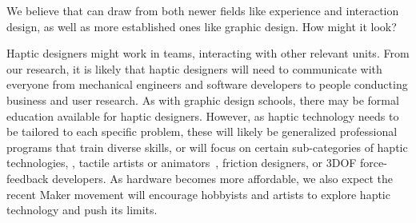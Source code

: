 We believe that \haxd can draw from both newer fields like experience and interaction design, as well as more established ones like graphic design.
How might it look?

Haptic designers might work in teams, interacting with other relevant units.
From our research, it is likely that haptic designers will need to %
 communicate with  everyone from mechanical engineers and software developers to people conducting business and user research.
As with graphic design schools, there may be formal education available for haptic designers.
However, as haptic technology needs to be tailored to each specific problem, these will likely be generalized professional programs that train diverse skills, or will focus on certain sub-categories of haptic technologies, \eg, tactile artists or animators~\citep{Schneider2015}, friction designers, or 3DOF force-feedback developers.
As hardware becomes more affordable, we also expect the recent Maker movement will encourage hobbyists and artists to explore haptic technology and push its limits. %

